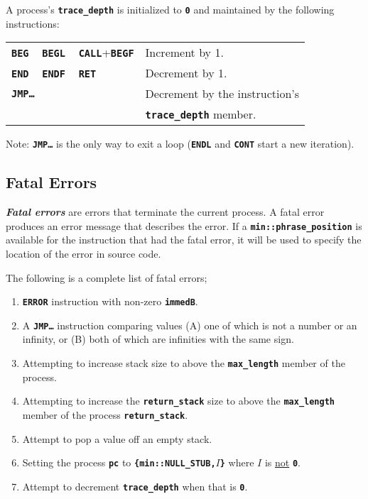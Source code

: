 \documentclass[12pt]{article}
\newcommand{\TT}[1]{{\tt \bfseries #1}}
\newcommand{\ikey}[2]{{\bf \em #1}\index{#2}}
\begin{document}
A process's \TT{trace\_depth} is initialized to \TT{0} and maintained
by the following instructions:
\begin{center}
\begin{tabular}{l@{~~~~}l}
\TT{BEG} ~ \TT{BEGL} ~ \TT{CALL}+\TT{BEGF} & Increment by 1. \\
\TT{END} ~ \TT{ENDF} ~ \TT{RET} & Decrement by 1. \\
\TT{JMP\ldots} & Decrement by the instruction's \\
               & \TT{trace\_depth} member. \\
\end{tabular}
\end{center}
Note: \TT{JMP\ldots} is the only way to exit a loop (\TT{ENDL} and
\TT{CONT} start a new iteration).

\subsection{Fatal Errors}
\label{FATAL-ERRORS}

\ikey{Fatal errors}{fatal error} are errors that terminate the current
process.  A fatal error produces an error message that describes the
error.  If a \TT{min::phrase\_position} is available for the instruction
that had the fatal error, it will be used to specify the location
of the error in source code.

The following is a complete list of fatal errors;
\begin{enumerate}
\item \TT{ERROR} instruction with non-zero \TT{immedB}.
\item A \TT{JMP\ldots} instruction comparing values
(A) one of which is not a number or an infinity, or
(B) both of which are infinities with the same sign.
\item Attempting to increase stack size to above the \TT{max\_length}
member of the process.
\item Attempting to increase the \TT{return\_stack}
size to above the \TT{max\_length} member of the process \TT{return\_stack}.
\item Attempt to pop a value off an empty stack.
\item Setting the process \TT{pc} to \TT{\{min::NULL\_STUB,$I$\}} where
$I$ is \underline{not} \TT{0}.
\item Attempt to decrement \TT{trace\_depth} when that is \TT{0}.

\end{enumerate}
\end{document}
